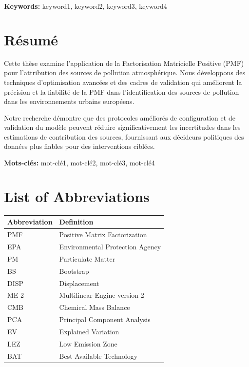\documentclass[
  letterpaper,
  oneside,
  openany]{MastersDoctoralThesis}
\begin{document}
\textbf{Keywords:} keyword1, keyword2, keyword3, keyword4


\chapter*{Résumé}\label{ruxe9sumuxe9}


Cette thèse examine l'application de la Factorisation Matricielle
Positive (PMF) pour l'attribution des sources de pollution
atmosphérique. Nous développons des techniques d'optimisation avancées
et des cadres de validation qui améliorent la précision et la fiabilité
de la PMF dans l'identification des sources de pollution dans les
environnements urbains européens.

Notre recherche démontre que des protocoles améliorés de configuration
et de validation du modèle peuvent réduire significativement les
incertitudes dans les estimations de contribution des sources,
fournissant aux décideurs politiques des données plus fiables pour des
interventions ciblées.

\textbf{Mots-clés:} mot-clé1, mot-clé2, mot-clé3, mot-clé4

\clearpage
\begingroup
\hypersetup{linkcolor=blue}
\tableofcontents
\cleardoublepage
\listoffigures
\cleardoublepage
\listoftables
\endgroup

\cleardoublepage


\chapter*{List of Abbreviations}\label{list-of-abbreviations}


\begin{longtable}[]{@{}ll@{}}
\toprule\noalign{}
Abbreviation & Definition \\
\midrule\noalign{}
\endhead
\bottomrule\noalign{}
\endlastfoot
PMF & Positive Matrix Factorization \\
EPA & Environmental Protection Agency \\
PM & Particulate Matter \\
BS & Bootstrap \\
DISP & Displacement \\
ME-2 & Multilinear Engine version 2 \\
CMB & Chemical Mass Balance \\
PCA & Principal Component Analysis \\
EV & Explained Variation \\
LEZ & Low Emission Zone \\
BAT & Best Available Technology \\
\end{longtable}
\end{document}
